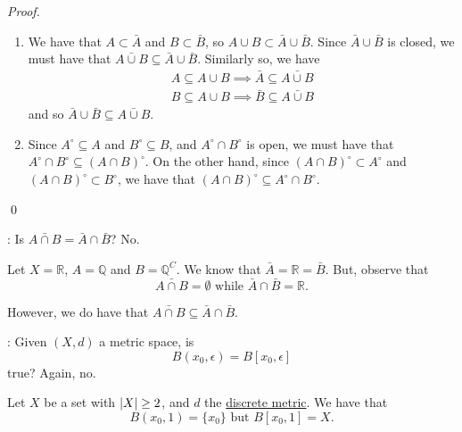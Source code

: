 \documentclass[notoc,notitlepage]{tufte-book}
\begin{document}
\begin{proof}
  \begin{enumerate}
    \item We have that $A \subset \bar{A}$ and $B \subset \bar{B}$, so $A \cup B \subset \bar{A} \cup \bar{B}$. Since $\bar{A} \cup \bar{B}$ is closed, we must have that $\bar{A \cup B} \subseteq \bar{A} \cup \bar{B}$. Similarly so, we have
      \begin{gather*}
        A \subseteq A \cup B \implies \bar{A} \subseteq \bar{A \cup B} \\
        B \subseteq A \cup B \implies \bar{B} \subseteq \bar{A \cup B}
      \end{gather*}
      and so $\bar{A} \cup \bar{B} \subseteq \bar{A \cup B}$.

    \item Since $A^\circ \subseteq A$ and $B^\circ \subseteq B$, and $A^\circ \cap B^\circ$ is open, we must have that $A^\circ \cap B^\circ \subseteq {(A \cap B)}^\circ$. On the other hand, since ${(A \cap B)}^\circ \subset A^\circ$ and ${(A \cap B)}^\circ \subset B^\circ$, we have that ${(A \cap B)}^\circ \subseteq A^\circ \cap B^\circ$.
  \end{enumerate}\qed\
\end{proof}

: Is $\bar{A \cap B} = \bar{A} \cap \bar{B}$? No.

\begin{eg}
  Let $X = \mathbb{R}$, $A = \mathbb{Q}$ and $B = \mathbb{Q}^C$. We know that $\bar{A} = \mathbb{R} = \bar{B}$. But, observe that
  \begin{equation*}
    \bar{A \cap B} = \emptyset \text{ while } \bar{A} \cap \bar{B} = \mathbb{R}.
  \end{equation*}
\end{eg}

However, we do have that $\bar{A \cap B} \subseteq \bar{A} \cap \bar{B}$.

: Given $(X, d)$ a metric space, is
\begin{equation*}
  B(x_0, \epsilon) = B[x_0, \epsilon]
\end{equation*}
true? Again, no.

\begin{eg}
  Let $X$ be a set with $\left|X\right| \geq 2$, and $d$ the \hyperref[eg:discrete_metric]{discrete metric}. We have that
  \begin{equation*}
    B(x_0, 1) = \{ x_0 \} \text{ but } B[x_0, 1] = X.
  \end{equation*}
\end{eg}
\end{document}
